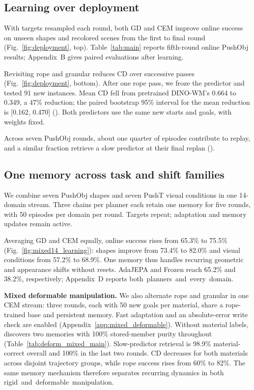\subsection{Learning over deployment}
\label{sec:deployment}

With targets resampled each round, both GD and CEM improve online success on unseen shapes and recolored scenes from the first to final round (Fig.~\ref{fig:deployment}, top). Table~\ref{tab:main} reports fifth-round online PushObj results; Appendix~B gives paired evaluations after learning.

Revisiting rope and granular reduces CD over successive passes (Fig.~\ref{fig:deployment}, bottom). After one rope pass, we froze the predictor and tested 91 new instances. Mean CD fell from pretrained DINO-WM's 0.664 to 0.349, a 47\% reduction; the paired bootstrap 95\% interval for the mean reduction is [0.162, 0.470] (). Both predictors use the same new starts and goals, with weights fixed.

Across seven PushObj rounds, about one quarter of episodes contribute to replay, and a similar fraction retrieve a slow predictor at their final replan ().

\subsection{One memory across task and shift families}
\label{sec:mixed14}

We combine seven PushObj shapes and seven PushT visual conditions in one 14-domain stream. Three chains per planner each retain one memory for five rounds, with 50 episodes per domain per round. Targets repeat; adaptation and memory updates remain active.

Averaging GD and CEM equally, online success rises from 65.3\% to 75.5\% (Fig.~\ref{fig:mixed14_learning}): shapes improve from 73.4\% to 82.0\% and visual conditions from 57.2\% to 68.9\%. One memory thus handles recurring geometric and appearance shifts without resets. AdaJEPA and Frozen reach 65.2\% and 38.2\%, respectively; Appendix~D reports \mbox{both planners and every domain}.

\vspace{1mm}
\noindent \textbf{Mixed deformable manipulation.}
We also alternate rope and granular in one CEM stream: three rounds, each with 50 new goals per material, share a rope-trained base and persistent memory. Fast adaptation and an absolute-error write check are enabled (Appendix~\ref{app:mixed_deformable}). Without material labels, \ours discovers two memories with 100\% stored-member purity throughout (Table~\ref{tab:deform_mixed_main}). Slow-predictor retrieval is 98.9\% material-correct overall and 100\% in the last two rounds. CD decreases for both materials across disjoint trajectory groups, while rope success rises from 60\% to 82\%. The same memory mechanism therefore separates recurring dynamics in both \mbox{rigid and deformable manipulation}.

